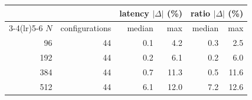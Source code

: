 \begin{tabular}{rrrrrr}
\toprule
& & \multicolumn{2}{c}{\textbf{latency} $|\Delta|$ (\%)}
& \multicolumn{2}{c}{\textbf{ratio} $|\Delta|$ (\%)} \\
\cmidrule(lr){3-4}\cmidrule(lr){5-6}
$N$ & configurations & median & max & median & max \\
\midrule
96 & 44 & 0.1 & 4.2 & 0.3 & 2.5 \\
192 & 44 & 0.2 & 6.1 & 0.2 & 6.0 \\
384 & 44 & 0.7 & 11.3 & 0.5 & 11.6 \\
512 & 44 & 6.1 & 12.0 & 7.2 & 12.6 \\
\bottomrule
\end{tabular}%
